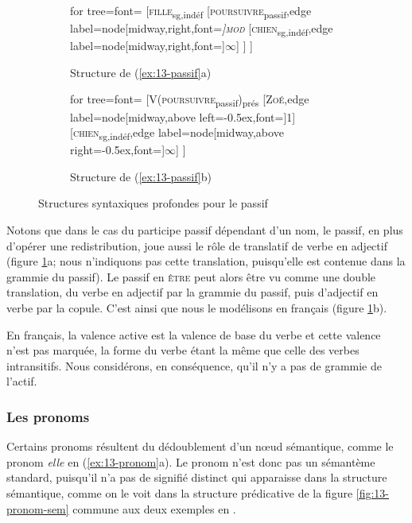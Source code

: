 \begin{figure}
	\begin{subfigure}[b]{0.5\textwidth}
		\centering
		\begin{forest} for tree={font=\normalfont}
			[\textsc{fille}\textsubscript{sg,indéf}
				[\textsc{poursuivre}\textsubscript{passif},edge label={node[midway,right,font=\footnotesize\itshape]{\textsc{mod}}}
					[\textsc{chien}\textsubscript{sg,indéf},edge label={node[midway,right,font=\footnotesize]{$\infty$}}]
				]
			]
		\end{forest}
		\caption{Structure de (\ref{ex:13-passif}a)}
	\end{subfigure}%
	\hfill
	\begin{subfigure}[b]{0.5\textwidth}
		\centering
		\begin{forest} for tree={font=\normalfont}
			[V(\textsc{poursuivre}\textsubscript{passif})\textsubscript{prés}
				[\textsc{Zoé},edge label={node[midway,above left=-0.5ex,font=\footnotesize]{1}}]
				[\textsc{chien}\textsubscript{sg,indéf},edge label={node[midway,above right=-0.5ex,font=\footnotesize]{$\infty$}}]
			]
		\end{forest}
		\caption{Structure de (\ref{ex:13-passif}b)}
	\end{subfigure}
\caption{Structures syntaxiques profondes pour le passif\label{fig:13-passif}}
\end{figure}

Notons que dans le cas du participe passif dépendant d’un nom, le passif, en plus d’opérer une redistribution, joue aussi le rôle de translatif de verbe en adjectif (figure \ref{fig:13-passif}a; nous n’indiquons pas cette translation, puisqu’elle est contenue dans la grammie du passif). Le passif en \textsc{être} peut alors être vu comme une double translation, du verbe en adjectif par la grammie du passif, puis d’adjectif en verbe par la copule. C’est ainsi que nous le modélisons en français (figure \ref{fig:13-passif}b).

En français, la valence active est la valence de base du verbe et cette valence n'est pas marquée, la forme du verbe étant la même que celle des verbes intransitifs.  Nous considérons, en conséquence, qu'il n'y a pas de grammie de l'actif.


\subsubsection{Les pronoms}
Certains pronoms résultent du dédoublement d’un nœud sémantique, comme le pronom \textit{elle} en (\ref{ex:13-pronom}a). Le pronom n’est donc pas un sémantème standard, puisqu’il n’a pas de signifié distinct qui apparaisse dans la structure sémantique, comme on le voit dans la structure prédicative de la figure \ref{fig:13-pronom-sem} commune aux deux exemples en .

